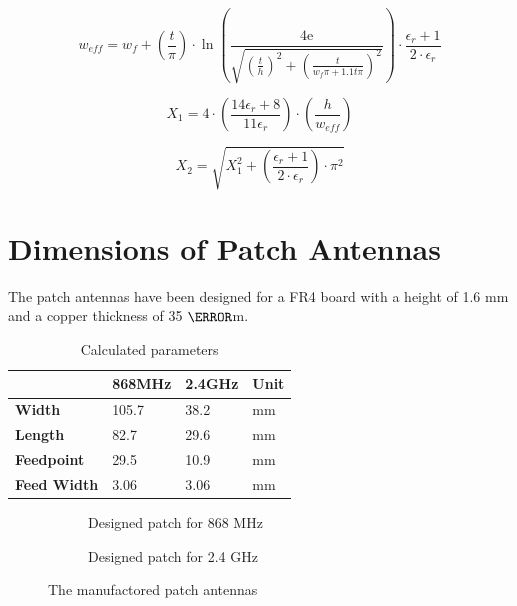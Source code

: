 \begin{equation}\label{eq:weff}
w_{eff} = w_{f}+\left(\frac{t}{\pi} \right) \cdot \ln \left(\frac{4\text{e}}{\sqrt{\left(\frac{t}{h}\right)^2+\left(\frac{t}{w_{f}\pi+1.1t\pi}\right)^2}}\right)\cdot \frac{\epsilon_r+1}{2\cdot \epsilon_r}
\end{equation}
\begin{where}
\end{where}

\begin{equation}\label{eq:x1}
X_1 = 4\cdot \left(\frac{14 \epsilon_r +8}{11 \epsilon_r}\right)\cdot \left(\frac{h}{w_{eff}}\right)
\end{equation}

\begin{equation}\label{eq:x2}
X_2 = \sqrt{X_1^2+\left(\frac{\epsilon_r+1}{2\cdot \epsilon_r}\right)\cdot\pi^2}
\end{equation}


\section{Dimensions of Patch Antennas}

The patch antennas have been designed for a FR4 board with a height of 1.6 mm and a copper thickness of 35 $\micro$m.

\begin{table}[H]
\centering
\begin{tabular}{l|lll}
                & \textbf{868MHz} & \textbf{2.4GHz} & \textbf{Unit} \\\hline
\textbf{Width}  & 105.7           & 38.2            & mm            \\
\textbf{Length} & 82.7            & 29.6            & mm            \\
\textbf{Feedpoint}  & 29.5            & 10.9            & mm            \\
\textbf{Feed Width}  & 3.06            & 3.06            & mm           
\end{tabular}
\caption{Calculated parameters}
\label{tab:parameters}
\end{table}


\begin{figure}[H]
\captionsetup{belowskip=0em}
\begin{subfigure}[b]{0.48\textwidth}
\caption{Designed patch for 868 MHz}
\label{fig:868Patch}
\end{subfigure}
\begin{subfigure}[b]{0.48\textwidth}
\caption{Designed patch for 2.4 GHz}
\label{fig:2.4Patch}
\end{subfigure}
\captionsetup{belowskip=-1.5em}
\caption{The manufactored patch antennas}
\end{figure}


